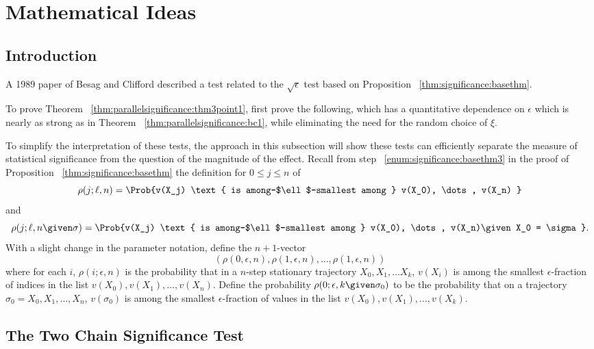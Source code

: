 \documentclass[12pt]{article}
\begin{document}
\section*{Mathematical Ideas}

\subsection*{Introduction}

A 1989 paper of Besag and Clifford
\cite{besag89} described a test related to the \( \sqrt{\epsilon} \)
test based on Proposition~%
\ref{thm:significance:basethm}.

\begin{remark}
    To prove Theorem~%
    \ref{thm:parallelsignificance:thm3point1}, first prove the following, which
    has a quantitative dependence on \( \epsilon \) which is nearly as
    strong as in Theorem~%
    \ref{thm:parallelsignificance:bc1}, while eliminating the need for the
    random choice of \( \xi \).
\end{remark}

To simplify the interpretation of these tests, the approach in this
subsection will show these tests can efficiently separate the measure of
statistical significance from the question of the magnitude of the
effect.  Recall from step~%
\ref{enum:significance:basethm3} in the proof of
Proposition~%
\ref{thm:significance:basethm} the definition for \( 0 \le j \le n \) of
\[
    \rho(j; \ell, n) = \Prob{v(X_j) \text{ is among-$\ell$-smallest
    among } v(X_0), \dots, v(X_n) }
\] and
\[
  \rho(j; \ell, n \given \sigma) = \Prob{v(X_j)
    \text{ is among-$\ell$-smallest among } v(X_0), \dots, v(X_n)%
    \given X_0 = \sigma }.
\] With a slight change in the parameter notation, define the \( n+1 \)-vector
\[ (\rho(0, \epsilon, n), \rho(1, \epsilon, n), \dots, \rho(1, \epsilon,
  n)) \]
where for each \( i \), \( \rho(i; \epsilon, n) \) is the
probability that in a \( n \)-step stationary trajectory \( X_0, X_1,
\dots X_k \), \( v(X_i) \) is among the smallest \( \epsilon
\)-fraction of indices
in the list \( v(X_0), v(X_1), \dots, v(X_n) \).  Define the probability
\( \rho(0; \epsilon, k \given \sigma_0) \) to be the probability that on a
trajectory \( \sigma_0 = X_0, X_1, \dots, X_n \), \( v(\sigma_0) \) is
among the smallest \( \epsilon \)-fraction of values in the list \( v(X_0),
v(X_1), \dots, v(X_k) \).

\subsection*{The Two Chain Significance Test}
\end{document}
